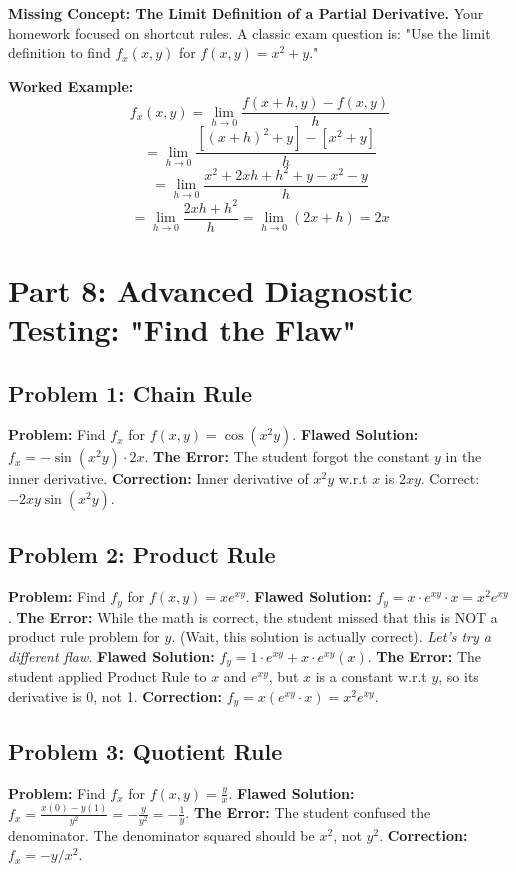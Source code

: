 \documentclass{article}
\begin{document}
\textbf{Missing Concept: The Limit Definition of a Partial Derivative.}
Your homework focused on shortcut rules. A classic exam question is:
"Use the limit definition to find $f_x(x,y)$ for $f(x,y) = x^2 + y$."

\textbf{Worked Example:}
\[ f_x(x,y) = \lim_{h \to 0} \frac{f(x+h, y) - f(x,y)}{h} \]
\[ = \lim_{h \to 0} \frac{[(x+h)^2 + y] - [x^2 + y]}{h} \]
\[ = \lim_{h \to 0} \frac{x^2 + 2xh + h^2 + y - x^2 - y}{h} \]
\[ = \lim_{h \to 0} \frac{2xh + h^2}{h} = \lim_{h \to 0} (2x + h) = 2x \]

\section{Part 8: Advanced Diagnostic Testing: "Find the Flaw"}

\subsection{Problem 1: Chain Rule}
\textbf{Problem:} Find $f_x$ for $f(x,y) = \cos(x^2 y)$.
\textbf{Flawed Solution:}
$f_x = -\sin(x^2 y) \cdot 2x$.
\textbf{The Error:} The student forgot the constant $y$ in the inner derivative.
\textbf{Correction:} Inner derivative of $x^2 y$ w.r.t $x$ is $2xy$. Correct: $-2xy \sin(x^2 y)$.

\subsection{Problem 2: Product Rule}
\textbf{Problem:} Find $f_y$ for $f(x,y) = x e^{xy}$.
\textbf{Flawed Solution:}
$f_y = x \cdot e^{xy} \cdot x = x^2 e^{xy}$.
\textbf{The Error:} While the math is correct, the student missed that this is NOT a product rule problem for $y$. (Wait, this solution is actually correct).
\textit{Let's try a different flaw.}
\textbf{Flawed Solution:} $f_y = 1 \cdot e^{xy} + x \cdot e^{xy}(x)$.
\textbf{The Error:} The student applied Product Rule to $x$ and $e^{xy}$, but $x$ is a constant w.r.t $y$, so its derivative is 0, not 1.
\textbf{Correction:} $f_y = x (e^{xy} \cdot x) = x^2 e^{xy}$.

\subsection{Problem 3: Quotient Rule}
\textbf{Problem:} Find $f_x$ for $f(x,y) = \frac{y}{x}$.
\textbf{Flawed Solution:}
$f_x = \frac{x(0) - y(1)}{y^2} = -\frac{y}{y^2} = -\frac{1}{y}$.
\textbf{The Error:} The student confused the denominator. The denominator squared should be $x^2$, not $y^2$.
\textbf{Correction:} $f_x = -y/x^2$.
\end{document}
